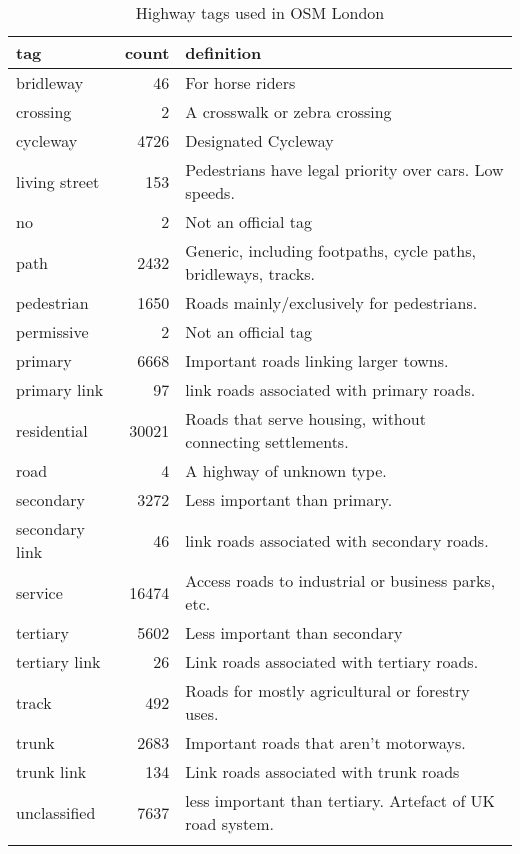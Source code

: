 \begin{table}
\centering
\begin{tabular}{lrl}
\\ \toprule
tag & count & definition \\
\midrule
bridleway& 46 & For horse riders\\
crossing & 2 & A crosswalk or zebra crossing \\
cycleway & 4726 & Designated Cycleway\\
living street & 153 & Pedestrians have legal priority over cars. Low speeds.\\
no & 2 & Not an official tag \\
path & 2432 & Generic, including footpaths, cycle paths, bridleways, tracks. \\
pedestrian & 1650 & Roads mainly/exclusively for pedestrians.\\
permissive & 2 & Not an official tag\\
primary & 6668 & Important roads linking larger towns.\\
primary link & 97 & link roads associated with primary roads.\\
residential & 30021 & Roads that serve housing, without connecting settlements.\\
 road & 4 & A highway of unknown type. \\
secondary & 3272 & Less important than primary.\\
secondary link & 46 & link roads associated with secondary roads.\\
service & 16474 & Access roads to industrial or business parks, etc. \\
tertiary & 5602 & Less important than secondary\\
tertiary link & 26 & Link roads associated with tertiary roads. \\ 
track & 492 & Roads for mostly agricultural or forestry uses. \\
trunk & 2683 & Important roads that aren't motorways. \\
trunk link & 134 & Link roads associated with trunk roads \\
unclassified & 7637 & less important than tertiary. Artefact of UK road system.\\ 
\\ \bottomrule
\end{tabular}
\caption{Highway tags used in OSM London}
\label{table:osm_tags}
\end{table}


